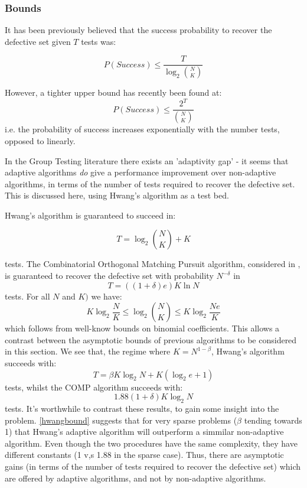 \subsubsection*{Bounds}
It has been previously believed that the success probability to recover the defective set given \(T\) tests was:

\begin{equation}
P\left(Success\right) \leq \frac{T}{\log_2{N \choose K}}
\end{equation}

However, a tighter upper bound has recently been found \cite{Aldridge2013} at:
%
\begin{equation}
P\left(Success\right) \leq \frac{2^T}{ {N \choose K} }
\end{equation}
%
i.e. the probability of success increases exponentially with the number tests, opposed to linearly. 

In the Group Testing literature there exists an 'adaptivity gap' - it seems that adaptive algorithms \textit{do} give a performance improvement over non-adaptive algorithms, in terms of the number of tests required to recover the defective set. This is discussed here, using Hwang's algorithm as a test bed.

Hwang's algorithm is guaranteed to succeed in:

\begin{equation}
T = \log_2{N\choose K} + K
\end{equation}

tests. The Combinatorial Orthogonal Matching Pursuit algorithm, considered in \cite{Chan2011}, is guaranteed to recover the defective set with probability \(N^{-\delta} \) in
%
\begin{equation}
T = \left(\left(1+\delta\right)e\right)K\ln{N}
\end{equation}
%
tests. For all \(N\) and \(K)\) we have:
%
\begin{equation}
K\log_2{\frac{N}{K}} \leq \log_2{N \choose K} \leq K \log_2{\frac{Ne}{K}}
\end{equation}
%
which follows from well-know bounds on binomial coefficients. This allows a contrast between the asymptotic bounds of previous algorithms to be considered in this section. We see that, the regime where \(K = N^{1-\beta}\), Hwang's algorithm succeeds with:
%
\begin{equation}
T = \beta K \log_2{N} + K\left(\log_2{e} + 1\right)
\end{equation}
\label{hwangbound}
%
tests, whilst the COMP algorithm succeeds with:
%
\begin{equation}
1.88\left(1+\delta\right)K\log_2{N}
\end{equation}
\label{compbound}
%
tests. It's worthwhile to contrast these results, to gain some insight into the problem. \ref{hwangbound} suggests that for very sparse problems (\(\beta\) tending towards 1) that Hwang's adaptive algorithm will outperform a simmilar non-adaptive algorithm. Even though the two procedures have the same complexity, they have different constants (1 v,s 1.88 in the sparse case). Thus, there are asymptotic gains (in terms of the number of tests required to recover the defective set) which are offered by adaptive algorithms, and not by non-adaptive algorithms.

